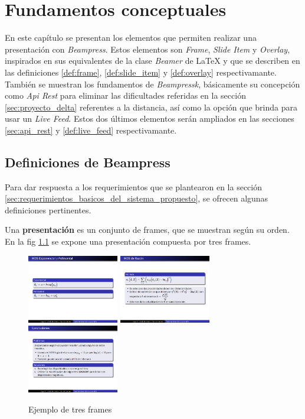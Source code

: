 
\chapter{Fundamentos conceptuales} %
\label{cha:fundamentos_conceptuales}
	En este capítulo se presentan los elementos que permiten realizar una presentación con \textit{Beampress}. Estos elementos son \textit{Frame}, \textit{Slide Item} y \textit{Overlay}, inspirados en sus equivalentes de la clase \textit{Beamer} de \LaTeX{} y que se describen en las definiciones \ref{def:frame}, \ref{def:slide_item} y \ref{def:overlay} respectivamante. También se muestran los fundamentos de \textit{Beampressk}, básicamente su concepción como \textit{Api Rest} para eliminar las dificultades referidas en la sección \ref{sec:proyecto_delta} referentes a la distancia, así como la opción que brinda para usar un \textit{Live Feed}. Estos dos últimos elementos serán ampliados en las secciones \ref{sec:api_rest} y \ref{def:live_feed} respectivamante. 

	\section{Definiciones de Beampress} %
	\label{sec:definiciones_de_beampress}
		Para dar respuesta a los requerimientos que se plantearon en la sección \ref{sec:requerimientos_basicos_del_sistema_propuesto}, se ofrecen algunas definiciones pertinentes.
		
 		\begin{definition}
 		\label{def:presentation}
			Una \textbf{presentación} es un conjunto de frames, que se muestran según su orden. En la fig \ref{fig:frames} se expone una presentación compuesta por tres frames.
 		\end{definition}

 		\begin{figure}[tb]
 			\centering
 			\includegraphics[width=4cm]{img/f1}
 			\includegraphics[width=4cm]{img/f2}
 			\includegraphics[width=4cm]{img/f3}
 			\caption{Ejemplo de tres frames}
 			\label{fig:frames}
 		\end{figure}

